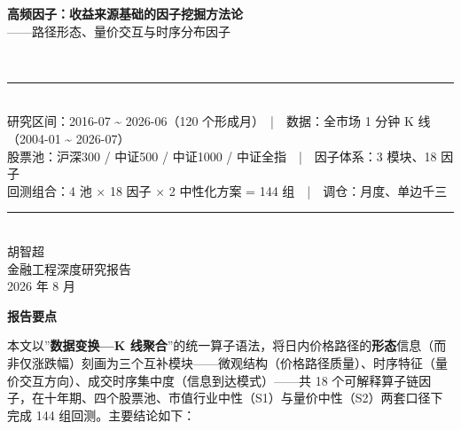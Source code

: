 \documentclass[UTF8,a4paper,zihao=-4,fontset=windows]{ctexart}
\begin{document}
\begin{titlepage}
\centering
\vspace*{1.8cm}
\begin{minipage}{0.98\textwidth}
\centering
{\fontsize{20.5pt}{30pt}\selectfont\bfseries\heiti\textcolor{reportred}{高频因子：收益来源基础的因子挖掘方法论}}\\[14pt]
{\fontsize{16pt}{26pt}\selectfont\heiti\color{black!78} ——路径形态、量价交互与时序分布因子}
\end{minipage}\\[18pt]
\textcolor{reportred}{\rule{0.64\textwidth}{1pt}}\\[14pt]
{\small\color{black!60} 研究区间：2016-07 \textasciitilde{} 2026-06（120 个形成月）　|　数据：全市场 1 分钟 K 线（2004-01 \textasciitilde{} 2026-07）\\[3pt]股票池：沪深300 / 中证500 / 中证1000 / 中证全指　|　因子体系：3 模块、18 因子\\[3pt]回测组合：4 池 × 18 因子 × 2 中性化方案 = 144 组　|　调仓：月度、单边千三}\\[22pt]
\vfill
\begin{flushright}
\begin{minipage}{0.34\textwidth}
\raggedleft
\textcolor{reportred}{\rule{\linewidth}{0.8pt}}\\[9pt]
{\large\heiti\color{black!85} 胡智超}\\[7pt]
{\small\color{black!55} 金融工程深度研究报告}\\[4pt]
{\small\color{black!55} 2026 年 8 月}
\end{minipage}
\end{flushright}
\vspace*{1.2cm}
\end{titlepage}
\tableofcontents
\newpage

\begin{tcolorbox}[colback=reportred,coltext=white,boxrule=0pt,left=8pt,right=8pt,top=5pt,bottom=5pt]
{\Large\bfseries\heiti 报告要点}
\end{tcolorbox}

本文以''\textbf{数据变换---K
线聚合}''的统一算子语法，将日内价格路径的\textbf{形态}信息（而非仅涨跌幅）刻画为三个互补模块------微观结构（价格路径质量）、时序特征（量价交互方向）、成交时序集中度（信息到达模式）------共
18
个可解释算子链因子，在十年期、四个股票池、市值行业中性（S1）与量价中性（S2）两套口径下完成
144 组回测。主要结论如下：
\end{document}
